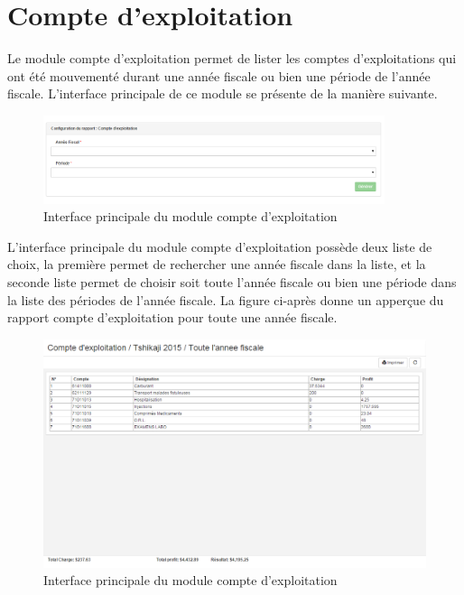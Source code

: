 \documentclass[12pt,a4paper]{report}
\begin{document}
\newpage
\section{Compte d'exploitation}
Le module compte d'exploitation permet de lister les comptes d'exploitations qui ont été mouvementé durant une année fiscale ou bien une période de l'année fiscale. L'interface principale de ce module se présente de la manière suivante.

\begin{figure}[h]
\begin{center}
\includegraphics[width=10cm]{pic/ComptExploitation.png}
\end{center}
\caption{Interface principale du module compte d'exploitation}
\label{Interface principale du module compte d'exploitation}
\end{figure}

L'interface principale du module compte d'exploitation possède deux liste de choix, la première permet de rechercher une année fiscale dans la liste, et la seconde liste permet de choisir soit toute l'année fiscale ou bien une période dans la liste des périodes de l'année fiscale. La figure ci-après donne un apperçue du rapport compte d'exploitation pour toute une année fiscale.

\begin{figure}[h]
\begin{center}
\includegraphics[width=14cm]{pic/ComptExploitaApp.png}
\end{center}
\caption{Interface principale du module compte d'exploitation}
\label{Interface principale du module compte d'exploitation}
\end{figure}
\end{document}
